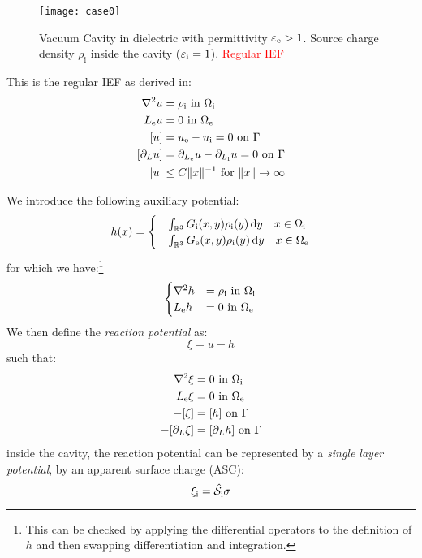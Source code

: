 \begin{figure}[h!]
  \centering
  \texttt{[image: case0]}
  \caption{Vacuum Cavity in dielectric with permittivity $\varepsilon_\mathrm{e}>1$.
  Source charge density $\rho_\mathrm{i}$ inside the cavity
  ($\varepsilon_\mathrm{i}=1$). \textcolor{red}{Regular IEF}}
  \label{fig:case0}
\end{figure}

This is the regular IEF as derived in:~\autocite{Cances1998}
\begin{subequations}
\begin{align}
  \nabla^2 u &= \rho_\mathrm{i} \,\, \text{in}\,\, \Omega_\mathrm{i} \\
  L_\mathrm{e} u &= 0 \,\, \text{in}\,\, \Omega_\mathrm{e} \\
  [u] &= u_\mathrm{e} - u_\mathrm{i} = 0 \,\, \text{on}\,\, \Gamma \\
[\partial_L u] &= \partial_{L_\mathrm{e}} u - \partial_{L_\mathrm{i}} u = 0 \,\,
\text{on}\,\, \Gamma \\
|u| &\leq C \|x \|^{-1} \,\,\text{for}\,\,\| x \|\rightarrow\infty
\end{align}
\end{subequations}

We introduce the following auxiliary potential:
\begin{equation}
  h(x) =
  \begin{cases}
    &\int_{\mathbb{R}^3}G_\mathrm{i}(x, y)\rho_\mathrm{i}(y)\mathop{}\!\mathrm{d} y  \quad x \in \Omega_\mathrm{i} \\
    &\int_{\mathbb{R}^3}G_\mathrm{e}(x, y)\rho_\mathrm{i}(y)\mathop{}\!\mathrm{d} y  \quad x \in \Omega_\mathrm{e}
  \end{cases}
\end{equation}
for which we have:\footnote{This can be checked by applying the
differential operators to the definition of $h$ and then swapping
differentiation and integration.}
\begin{equation}
  \begin{cases}
    \nabla^2 h &= \rho_\mathrm{i} \,\, \text{in}\,\, \Omega_\mathrm{i} \\
    L_\mathrm{e} h &= 0 \,\, \text{in}\,\, \Omega_\mathrm{e}
  \end{cases}
\end{equation}
We then define the \emph{reaction potential} as:
\begin{equation}
  \xi = u - h
\end{equation}
such that:
\begin{subequations}
\begin{align}
  \nabla^2 \xi &= 0 \,\, \text{in}\,\, \Omega_\mathrm{i} \\
  L_\mathrm{e} \xi &= 0 \,\, \text{in}\,\, \Omega_\mathrm{e} \\
  -[\xi] &= [h] \,\, \text{on}\,\, \Gamma \\
  -[\partial_L \xi] &= [\partial_L h] \,\, \text{on}\,\, \Gamma
\end{align}
\end{subequations}
inside the cavity, the reaction potential can be represented by a
\emph{single layer potential}, \ie by an apparent surface charge (ASC):
\begin{equation}
  \xi_\mathrm{i} = \hat{\mathcal{S}}_\mathrm{i}\sigma
\end{equation}


